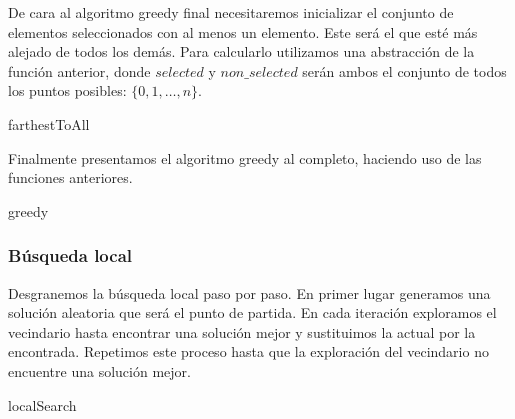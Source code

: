 \documentclass[11pt,a4paper]{article}
\begin{document}
	De cara al algoritmo greedy final necesitaremos inicializar el conjunto de elementos seleccionados con al menos un elemento. Este será el que esté más alejado de todos los demás. Para calcularlo utilizamos una abstracción de la función anterior, donde $selected$ y $non\_selected$ serán ambos el conjunto de todos los puntos posibles: $\{0,1,\dotsc, n\}$. \\
	
	\begin{algorithm}[H]
		\caption{farthestToAll}
	\end{algorithm}

	Finalmente presentamos el algoritmo greedy al completo, haciendo uso de las funciones anteriores. \\

	\begin{algorithm}[H]
		\caption{greedy}
	\end{algorithm}

	\subsubsection{Búsqueda local}
	
	Desgranemos la búsqueda local paso por paso. En primer lugar generamos una solución aleatoria que será el punto de partida. En cada iteración exploramos el vecindario hasta encontrar una solución mejor y sustituimos la actual por la encontrada. Repetimos este proceso hasta que la exploración del vecindario no encuentre una solución mejor. \\
	
	\begin{algorithm}[H]
		\caption{localSearch}
	\end{algorithm}
\end{document}
